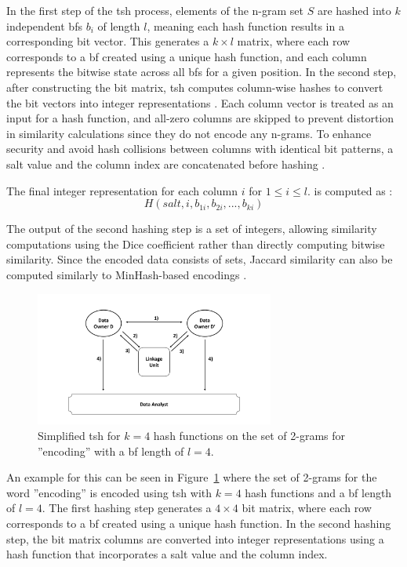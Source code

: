 In the first step of the \ac{tsh} process, elements of the n-gram set \(S\) are hashed into \(k\) independent \ac{bf}s \(b_i\) of length \(l\), meaning each hash function results in a corresponding bit vector.
This generates a \(k \times l\) matrix, where each row corresponds to a \ac{bf} created using a unique hash function, and each column represents the bitwise state across all \ac{bf}s for a given position.
In the second step, after constructing the bit matrix, \ac{tsh} computes column-wise hashes to convert the bit vectors into integer representations .
Each column vector is treated as an input for a hash function, and all-zero columns are skipped to prevent distortion in similarity calculations since they do not encode any n-grams.
To enhance security and avoid hash collisions between columns with identical bit patterns, a salt value and the column index are concatenated before hashing \cite{schaefer2024, vidanage2020graph}.

The final integer representation for each column $i$ for $1 \leq i \leq l$. is computed as \cite{schaefer2024}:
\begin{equation}
    H(salt, i, b_{1i}, b_{2i}, ..., b_{ki})
\end{equation}

The output of the second hashing step is a set of integers, allowing similarity computations using the Dice coefficient rather than directly computing bitwise similarity.
Since the encoded data consists of sets, Jaccard similarity can also be computed similarly to MinHash-based encodings \cite{schaefer2024}.

\begin{figure}[H]
  \centering
  \includegraphics[width=0.7\textwidth, page=8]{img/visualization.pdf}
  \caption{Simplified \ac{tsh} for $k = 4$ hash functions on the set of 2-grams for ''encoding'' with a \ac{bf} length of $l = 4$.}
  \label{fig:tshexample}
\end{figure}

An example for this can be seen in Figure~\ref{fig:tshexample} where the set of 2-grams for the word ''encoding'' is encoded using \ac{tsh} with $k = 4$ hash functions and a \ac{bf} length of $l = 4$.
The first hashing step generates a $4 \times 4$ bit matrix, where each row corresponds to a \ac{bf} created using a unique hash function.
In the second hashing step, the bit matrix columns are converted into integer representations using a hash function that incorporates a salt value and the column index.


